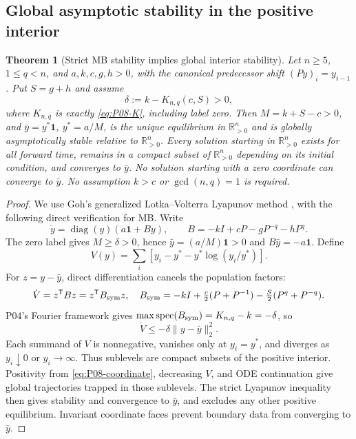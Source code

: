 \documentclass[11pt]{article}
\newcommand{\R}{\mathbb{R}}
\newcommand{\one}{\mathbf{1}}
\newcommand{\PosOrth}{\R_{>0}^{n}}
\DeclareMathOperator{\spec}{spec}
\DeclareMathOperator{\diag}{diag}
\newtheorem{theorem}{Theorem}[section]
\theoremstyle{definition}
\theoremstyle{remark}
\begin{document}
\subsection{Global asymptotic stability in the positive interior}
\begin{theorem}[Strict MB stability implies global interior stability]
\label{thm:P08-global-interior}
Let $n\ge5$, $1\le q<n$, and $a,k,c,g,h>0$, with the canonical
predecessor shift $(Py)_i=y_{i-1}$. Put $S=g+h$ and assume
\[
 \delta:=k-K_{n,q}(c,S)>0,
\]
where $K_{n,q}$ is exactly \eqref{eq:P08-K}, including label zero.
Then $M=k+S-c>0$, and $\bar y=y^*\one$, $y^*=a/M$, is the unique
equilibrium in $\PosOrth$ and is globally asymptotically stable relative
to $\PosOrth$. Every solution starting in $\PosOrth$ exists for all
forward time, remains in a compact subset of $\PosOrth$ depending on
its initial condition, and converges to $\bar y$.
No solution starting with a zero coordinate can converge to $\bar y$.
No assumption $k>c$ or $\gcd(n,q)=1$ is required.
\end{theorem}
\begin{proof}
We use Goh's generalized Lotka--Volterra Lyapunov method
\cite{Goh1977}, with the following direct verification for MB. Write
\begin{equation}
 \dot y=\diag(y)(a\one+By),\qquad B=-kI+cP-gP^{-q}-hP^q.
 \label{eq:P08-global-field}
\end{equation}
The zero label gives $M\ge\delta>0$, hence
$\bar y=(a/M)\one>0$ and $B\bar y=-a\one$. Define
\begin{equation}
 V(y)=\sum_i[y_i-y^*-y^*\log(y_i/y^*)].
 \label{eq:P08-global-V}
\end{equation}
For $z=y-\bar y$, direct differentiation cancels the population factors:
\begin{equation}
 \dot V=z^{\mathsf T}Bz=z^{\mathsf T}B_{\rm sym}z,
 \quad B_{\rm sym}=-kI+\tfrac c2(P+P^{-1})-\tfrac S2(P^q+P^{-q}).
 \label{eq:P08-global-cancellation}
\end{equation}
P04's Fourier framework gives
$\max\spec(B_{\rm sym})=K_{n,q}-k=-\delta$, so
\begin{equation}
 \dot V\le-\delta\|y-\bar y\|_2^2.
 \label{eq:P08-global-decay}
\end{equation}
Each summand of $V$ is nonnegative, vanishes only at $y_i=y^*$,
and diverges as $y_i\downarrow0$ or $y_i\to\infty$.
Thus sublevels are compact subsets of the positive interior. Positivity
from \eqref{eq:P08-coordinate}, decreasing $V$, and ODE continuation
give global trajectories trapped in those sublevels. The strict Lyapunov
inequality then gives stability and convergence to $\bar y$, and excludes
any other positive equilibrium. Invariant coordinate faces prevent
boundary data from converging to $\bar y$.
\end{proof}
\end{document}
